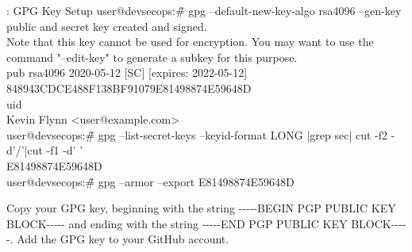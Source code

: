 \begin{mybox}{\thetcbcounter: GPG Key Setup}
	user@devsecops:\~\# gpg --default-new-key-algo rsa4096 --gen-key\\
	public and secret key created and signed.\\
	Note that this key cannot be used for encryption.  You may want to use
	the command "--edit-key" to generate a subkey for this purpose.\\
	pub   rsa4096 2020-05-12 [SC] [expires: 2022-05-12]\\
	\hspace*{15mm}      848943CDCE488F138BF91079E81498874E59648D\\
	uid\\
	\hspace*{25mm}                     Kevin Flynn <user@example.com>\\
	
	user@devsecops:\~\# gpg --list-secret-keys --keyid-format LONG |grep sec| cut -f2 -d'/'|cut -f1 -d' '\\
	E81498874E59648D\\
	user@devsecops:\~\# gpg --armor --export E81498874E59648D
\end{mybox}
\justify
Copy your GPG key, beginning with the string
-\/-\/-\/-\/-BEGIN PGP PUBLIC KEY BLOCK-\/-\/-\/-\/- and ending with the string
-\/-\/-\/-\/-END PGP PUBLIC KEY BLOCK-\/-\/-\/-\/-. Add the GPG key to
your GitHub account.

